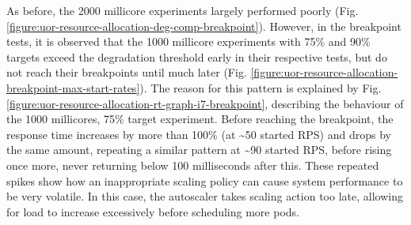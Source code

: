 As before, the 2000 millicore experiments largely performed poorly (Fig. \ref{figure:uor-resource-allocation-deg-comp-breakpoint}). However, in the breakpoint tests, it is observed that the 1000 millicore experiments with 75\% and 90\% targets exceed the degradation threshold early in their respective tests, but do not reach their breakpoints until much later (Fig. \ref{figure:uor-resource-allocation-breakpoint-max-start-rates}). The reason for this pattern is explained by Fig. \ref{figure:uor-resource-allocation-rt-graph-i7-breakpoint}, describing the behaviour of the 1000 millicores, 75\% target experiment. Before reaching the breakpoint, the response time increases by more than 100\% (at \textasciitilde50 started RPS) and drops by the same amount, repeating a similar pattern at \textasciitilde90 started RPS, before rising once more, never returning below 100 milliseconds after this. These repeated spikes show how an inappropriate scaling policy can cause system performance to be very volatile. In this case, the autoscaler takes scaling action too late, allowing for load to increase excessively before scheduling more pods.

